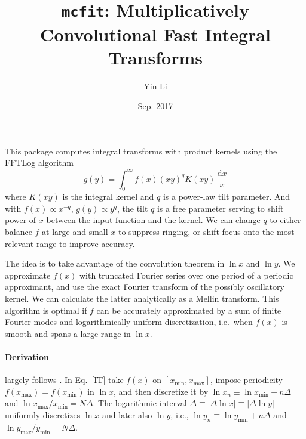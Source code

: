 \documentclass{article}
\renewcommand{\d}{\mathrm{d}}
\newcommand{\xmin}{x_\mathrm{min}}
\newcommand{\xmax}{x_\mathrm{max}}
\newcommand{\ymin}{y_\mathrm{min}}
\newcommand{\ymax}{y_\mathrm{max}}
\begin{document}
\title{\texttt{mcfit}: Multiplicatively Convolutional Fast Integral Transforms}
\author{Yin Li}
\date{Sep. 2017}
\maketitle


This package computes integral transforms with product kernels
using the FFTLog algorithm \cite{Talman78,Hamilton00}
\begin{equation}
    \label{IT}
    g(y) = \int_0^\infty f(x) (xy)^q K(xy) \,\frac{\d x}x
\end{equation}
where $K(xy)$ is the integral kernel and $q$ is a power-law tilt parameter.
And with $f(x)\propto x^{-q}$, $g(y)\propto y^q$, the tilt $q$ is a free
parameter serving to shift power of $x$ between the input function and the
kernel.
We can change $q$ to either balance $f$ at large and small $x$ to suppress
ringing, or shift focus onto the most relevant range to improve accuracy.

The idea is to take advantage of the convolution theorem in $\ln x$ and $\ln y$.
We approximate $f(x)$ with truncated Fourier series over one period of a
periodic approximant, and use the exact Fourier transform of the possibly
oscillatory kernel.
We can calculate the latter analytically as a Mellin transform.
This algorithm is optimal if $f$ can be accurately approximated by a sum of
finite Fourier modes and logarithmically uniform discretization, i.e.\ when
$f(x)$ is smooth and spans a large range in $\ln x$.


\paragraph{Derivation} largely follows \cite{Hamilton00}.
In Eq.~\eqref{IT} take $f(x)$ on $[\xmin, \xmax]$, impose periodicity
$f(\xmax)=f(\xmin)$ in $\ln x$, and then discretize it by
$\ln x_n\equiv\ln\xmin+n\Delta$ and $\ln\xmax/\xmin=N\Delta$.
The logarithmic interval $\Delta\equiv|\Delta\ln x|\equiv|\Delta\ln y|$
uniformly discretizes $\ln x$ and later also $\ln y$,
i.e., $\ln y_n\equiv\ln\ymin+n\Delta$ and $\ln\ymax/\ymin=N\Delta$.
\end{document}
